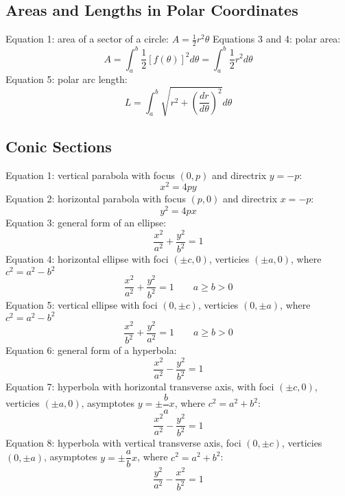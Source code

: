 \documentclass{article}
\begin{document}
\begin{multicols}{2}
    \subsection{Areas and Lengths in Polar Coordinates}
    \begin{outline}
        \1 Equation 1: area of a sector of a circle: \(A=\frac{1}{2}r^2\theta\)
        \1 Equations 3 and 4: polar area: \[A=\int^b_a\frac{1}{2}[f(\theta)]^2d\theta=\int^b_a\frac{1}{2}r^2d\theta\]
        \1 Equation 5: polar arc length: \[L=\int^b_a\sqrt{r^2+\left(\dfrac{dr}{d\theta}\right)^2}d\theta\]
    \end{outline}
    \subsection{Conic Sections}
    \begin{outline}
        \1 Equation 1: vertical parabola with focus \((0,p)\) and directrix \(y=-p\): \[x^2=4py\]
        \1 Equation 2: horizontal parabola with focus \((p,0)\) and directrix \(x=-p\): \[y^2=4px\]
        \1 Equation 3: general form of an ellipse: \[\dfrac{x^2}{a^2}+\dfrac{y^2}{b^2}=1\]
        \1 Equation 4: horizontal ellipse with foci \((\pm c,0)\), verticies \((\pm a,0)\), where \(c^2=a^2-b^2\) \[\dfrac{x^2}{a^2}+\dfrac{y^2}{b^2}=1\qquad a\geq b>0\]
        \1 Equation 5: vertical ellipse with foci \((0,\pm c)\), verticies \((0,\pm a)\), where \(c^2=a^2-b^2\) \[\dfrac{x^2}{b^2}+\dfrac{y^2}{a^2}=1\qquad a\geq b>0\]
        \1 Equation 6: general form of a hyperbola: \[\dfrac{x^2}{a^2}-\dfrac{y^2}{b^2}=1\]
        \1 Equation 7: hyperbola with horizontal transverse axis, with foci \((\pm c,0)\), verticies \((\pm a,0)\), asymptotes \(y=\pm\dfrac{b}{a}x\), where \(c^2=a^2+b^2\): \[\dfrac{x^2}{a^2}-\dfrac{y^2}{b^2}=1\]
        \1 Equation 8: hyperbola with vertical transverse axis, foci \((0,\pm c)\), verticies \((0,\pm a)\), asymptotes \(y=\pm\dfrac{a}{b}x\), where \(c^2=a^2+b^2\): \[\dfrac{y^2}{a^2}-\dfrac{x^2}{b^2}=1\]

    \end{outline}

\end{multicols}
\end{document}
